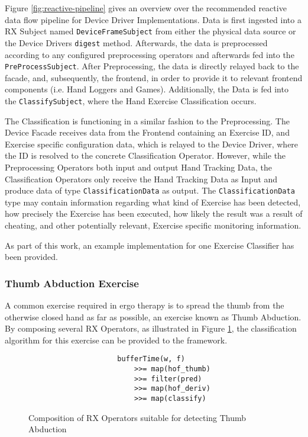 Figure \ref{fig:reactive-pipeline} gives an overview over the recommended reactive data flow pipeline for Device Driver Implementations. Data is first ingested into a \gls{RX} Subject named \texttt{DeviceFrameSubject} from either the physical data source or the Device Drivers \texttt{digest} method. Afterwards, the data is preprocessed according to any configured preprocessing operators and afterwards fed into the \texttt{PreProcessSubject}. After Preprocessing, the data is directly relayed back to the facade, and, subsequently, the frontend, in order to provide it to relevant frontend components (i.e. Hand Loggers and Games). Additionally, the Data is fed into the \texttt{ClassifySubject}, where the Hand Exercise Classification occurs.

The Classification is functioning in a similar fashion to the Preprocessing. The Device Facade receives data from the Frontend containing an Exercise ID, and Exercise specific configuration data, which is relayed to the Device Driver, where the ID is resolved to the concrete Classification Operator. However, while the Preprocessing Operators both input and output Hand Tracking Data, the Classification Operators only receive the Hand Tracking Data as Input and produce data of type \texttt{ClassificationData} as output. The \texttt{ClassificationData} type may contain information regarding what kind of Exercise has been detected, how precisely the Exercise has been executed, how likely the result was a result of cheating, and other potentially relevant, Exercise specific monitoring information. 

As part of this work, an example implementation for one Exercise Classifier has been provided.

\subsubsection{Thumb Abduction Exercise}
A common exercise required in ergo therapy is to spread the thumb from the otherwise closed hand as far as possible, an exercise known as Thumb Abduction\cite[sec. 4.1.5, par. Abduction]{StudiArbeitVolzBaumotte}. By composing several \gls{RX} Operators, as illustrated in Figure \ref{fig:rx-composition}, the classification algorithm for this exercise can be provided to the framework.

\begin{figure}
\begin{verbatim}
                     bufferTime(w, f) 
                         >>= map(hof_thumb)
                         >>= filter(pred) 
                         >>= map(hof_deriv) 
                         >>= map(classify)
\end{verbatim}
\caption{Composition of \gls{RX} Operators suitable for detecting Thumb Abduction}
\label{fig:rx-composition}
\end{figure}

